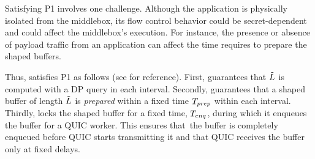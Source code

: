 
Satisfying P1 involves one challenge. Although the application is physically
isolated from the middlebox, its flow control behavior could be
secret-dependent and could affect the middlebox's execution.
For instance, the presence or absence of payload traffic from an application
can affect the time {\dshaper} requires to prepare the shaped buffers.

Thus, {\dshaper} satisfies P1 as follows (see  for
reference).
First, {\prepare} {guarantees that $\tilde{L}$ is computed with a DP query
in each interval}.
Secondly, {\prepare} guarantees that a shaped buffer of length $\tilde{L}$ is {\em
prepared} within a fixed time $T_{prep}$ within each interval.
Thirdly, {\prepare} locks the shaped buffer for a fixed time,
$T_{enq}$, during which it enqueues the buffer for a QUIC
worker.
This ensures that~the buffer is completely enqueued before QUIC starts
transmitting it and that QUIC receives the buffer only at fixed delays.

